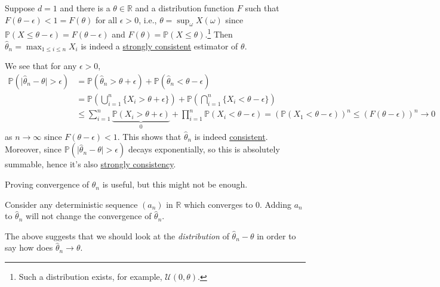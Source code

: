\begin{eg}
	Suppose \(d = 1\) and there is a \(\theta \in \mathbb{R} \) and a distribution function \(F\) such that \(F(\theta - \epsilon ) < 1 = F(\theta )\) for all \(\epsilon > 0\), i.e., \(\theta = \sup_{\omega } X(\omega )\) since \(\mathbb{P} (X \leq \theta - \epsilon ) = F(\theta - \epsilon )\) and \(F(\theta ) = \mathbb{P} (X \leq \theta )\).\footnote{Such a distribution exists, for example, \(\mathcal{U} (0, \theta )\).} Then \(\hat{\theta} _n = \max _{1 \leq i \leq n} X_i \) is indeed a \hyperref[def:strongly-consistent]{strongly consistent} estimator of \(\theta \).
\end{eg}
\begin{explanation}
	We see that for any \(\epsilon > 0\),
	\[
		\begin{split}
			\mathbb{P} (\vert \hat{\theta} _n - \theta \vert > \epsilon )
			 & = \mathbb{P} (\hat{\theta} _n > \theta + \epsilon ) + \mathbb{P} (\hat{\theta} _n < \theta - \epsilon )                                                  \\
			 & = \mathbb{P} \left( \bigcup_{i=1}^{n} \{ X_i > \theta + \epsilon \}  \right) + \mathbb{P} \left( \bigcap_{i=1}^{n} \{ X_i < \theta - \epsilon \} \right) \\
			 & \leq \sum_{i=1}^{n} \underbrace{\mathbb{P} (X_i > \theta + \epsilon )}_{0} + \prod_{i=1}^{n} \mathbb{P} (X_i < \theta -\epsilon )
			= \left( \mathbb{P} (X_1 < \theta - \epsilon ) \right) ^n
			\leq \left( F(\theta - \epsilon ) \right) ^n \to 0
		\end{split}
	\]
	as \(n \to \infty \) since \(F(\theta - \epsilon ) < 1\). This shows that \(\hat{\theta} _n\) is indeed \hyperref[def:consistent]{consistent}. Moreover, since \(\mathbb{P} (\vert \hat{\theta} _n - \theta \vert > \epsilon )\) decays exponentially, so this is absolutely summable, hence it's also \hyperref[def:strongly-consistent]{strongly consistency}.
\end{explanation}

Proving convergence of \(\hat{\theta} _n\) is useful, but this might not be enough.

\begin{eg}
	Consider any deterministic sequence \((a_n)\) in \(\mathbb{R} \) which converges to \(0\). Adding \(a_n\) to \(\hat{\theta} _n\) will not change the convergence of \(\hat{\theta} _n\).
\end{eg}

The above suggests that we should look at the \emph{distribution} of \(\hat{\theta} _n - \theta \) in order to say how does \(\hat{\theta} _n \to \theta \).

